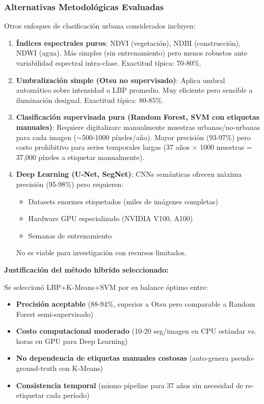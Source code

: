 \subsubsection{Alternativas Metodológicas Evaluadas}

Otros enfoques de clasificación urbana considerados incluyen:

\begin{enumerate}[itemsep=2pt]
	\item \textbf{Índices espectrales puros}: NDVI (vegetación), NDBI (construcción), NDWI (agua). Más simples (sin entrenamiento) pero menos robustos ante variabilidad espectral intra-clase. Exactitud típica: 70-80\%.
    
	\item \textbf{Umbralización simple (Otsu no supervisado)}: Aplica umbral automático sobre intensidad o LBP promedio. Muy eficiente pero sensible a iluminación desigual. Exactitud típica: 80-85\%.
    
	\item \textbf{Clasificación supervisada pura (Random Forest, SVM con etiquetas manuales)}: Requiere digitalizarc manualmente muestras urbanas/no-urbanas para cada imagen ($\sim$500-1000 píxeles/año). Mayor precisión (93-97\%) pero costo prohibitivo para series temporales largas (37 años × 1000 muestras = 37,000 píxeles a etiquetar manualmente).
    
	\item \textbf{Deep Learning (U-Net, SegNet)}: CNNs semánticas ofrecen máxima precisión (95-98\%) pero requieren:
	\begin{itemize}[itemsep=1pt]
		\item Datasets enormes etiquetados (miles de imágenes completas)
		\item Hardware GPU especializado (NVIDIA V100, A100)
		\item Semanas de entrenamiento
	\end{itemize}
	No es viable para investigación con recursos limitados.
\end{enumerate}

\textbf{Justificación del método híbrido seleccionado:}

Se seleccionó LBP+K-Means+SVM por su balance óptimo entre:
\begin{itemize}[itemsep=2pt]
	\item \textbf{Precisión aceptable} (88-94\%, superior a Otsu pero comparable a Random Forest semi-supervisado)
	\item \textbf{Costo computacional moderado} (10-20 seg/imagen en CPU estándar vs. horas en GPU para Deep Learning)
	\item \textbf{No dependencia de etiquetas manuales costosas} (auto-genera pseudo-ground-truth con K-Means)
	\item \textbf{Consistencia temporal} (mismo pipeline para 37 años sin necesidad de re-etiquetar cada período)
\end{itemize}

